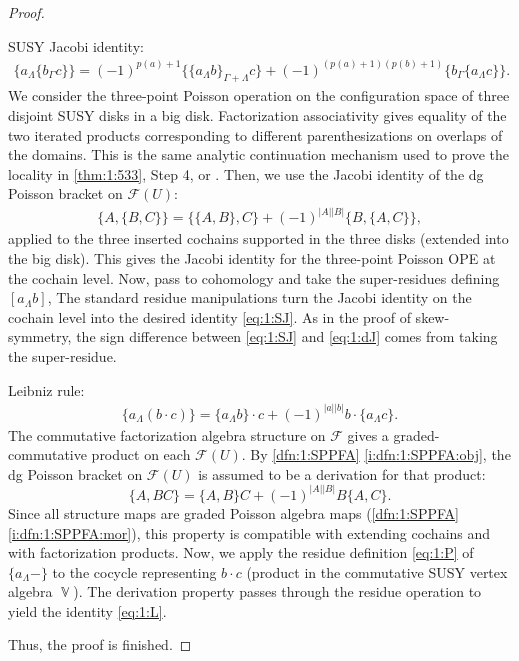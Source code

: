 \documentclass[final,reqno]{amsart}
\numberwithin{equation}{section}
\theoremstyle{definition}
\newcommand{\clF}{\mathcal{F}}
\newcommand{\abs}[1]{\left| #1 \right|}
\DeclareMathOperator{\bbV}{\mathbb{V}}
\begin{document}
\begin{proof}
\begin{clist}
\item SUSY Jacobi identity: 
\begin{align}\label{eq:1:SJ}
 \{a_\Lambda \{b_\Gamma c\}\} = 
 (-1)^{p(a)+1}          \{\{a_\Lambda b\}_{\Gamma+\Lambda}c\} +
 (-1)^{(p(a)+1)(p(b)+1)}\{b_\Gamma\{a_\Lambda c\}\}.
\end{align}
We consider the three-point Poisson operation on the configuration space of 
three disjoint SUSY disks in a big disk. 
Factorization associativity gives equality of the two iterated products 
corresponding to different parenthesizations on overlaps of the domains.
This is the same analytic continuation mechanism used to prove 
the locality in \cref{thm:1:533}, Step 4, or \cite[Proposition 5.3.6]{CG1}.
Then, we use the Jacobi identity of the dg Poisson bracket on $\clF(U)$:
\begin{align}\label{eq:1:dJ}
 \{A,\{B,C\}\} = \{\{A,B\},C\} + (-1)^{\abs{A}\abs{B}}\{B,\{A,C\}\},
\end{align}
applied to the three inserted cochains 
supported in the three disks (extended into the big disk).
This gives the Jacobi identity for the three-point Poisson OPE 
at the cochain level. 
Now, pass to cohomology and take the super-residues defining $[a_\Lambda b]$, 
The standard residue manipulations turn the Jacobi identity 
on the cochain level into the desired identity \eqref{eq:1:SJ}.
As in the proof of skew-symmetry,
the sign difference between \eqref{eq:1:SJ} and \eqref{eq:1:dJ} 
comes from taking the super-residue.

\item 
Leibniz rule:
\begin{align}\label{eq:1:L}
 \{a_\Lambda (b\cdot c)\} = 
 \{a_\Lambda b\}\cdot c + (-1)^{|a||b|} b\cdot \{a_\Lambda c\}.
\end{align}
The commutative factorization algebra structure on $\clF$ 
gives a graded-commutative product on each $\clF(U)$.
By \cref{dfn:1:SPPFA} \ref{i:dfn:1:SPPFA:obj}, 
the dg Poisson bracket on $\clF(U)$ is 
assumed to be a derivation for that product:
\[
 \{A,BC\} = \{A,B\}C + (-1)^{\abs{A}\abs{B}}B\{A,C\}.
\]
Since all structure maps are graded Poisson algebra maps 
(\cref{dfn:1:SPPFA} \ref{i:dfn:1:SPPFA:mor}), 
this property is compatible with extending cochains 
and with factorization products.
Now, we apply the residue definition \eqref{eq:1:P} of $\{a_\Lambda-\}$ to 
the cocycle representing $b \cdot c$ 
(product in the commutative SUSY vertex algebra $\bbV$). 
The derivation property passes through
the residue operation to yield the identity \eqref{eq:1:L}.
\end{clist}
Thus, the proof is finished.
\end{proof}
\end{document}
